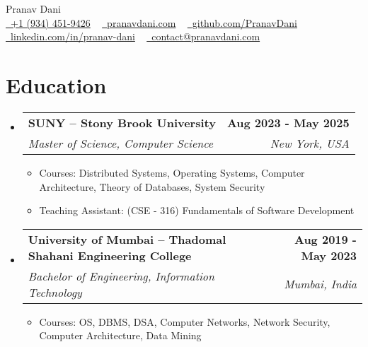\documentclass[letterpaper,11pt]{article}
\makeatletter
\newcommand{\resumeItem}[1]{
  \item\small{
    {#1 \vspace{-2pt}}
  }
}
\newcommand{\resumeSubheading}[4]{
  \vspace{-2pt}\item
    \begin{tabular*}{1.0\textwidth}[t]{l@{\extracolsep{\fill}}r}
      \vspace{-2pt}\textbf{#1} & \textbf{\small #2} \\
      \textit{\small#3} & \textit{\small #4} \\
    \end{tabular*}\vspace{-7pt}
}
\newcommand{\resumeSubHeadingListStart}{\begin{itemize}[leftmargin=0.0in, label={}]}
\newcommand{\resumeSubHeadingListEnd}{\end{itemize}}
\newcommand{\resumeItemListStart}{\begin{itemize}}
\newcommand{\resumeItemListEnd}{\end{itemize}\vspace{-5pt}}
\makeatother
\begin{document}

\begin{center}
    {\huge Pranav Dani} \\ \vspace{4pt}
    \small
    \faMobile
    \href{tel:+19344529426}{\raisebox{-0.2\height}\ +1 (934) 451-9426} ~
    \faGlobe \href{https://pranavdani.com}{\raisebox{-0.1\height}\ pranavdani.com} ~
    \faGithub \href{https://github.com/PranavDani}{\raisebox{-0.2\height}\ github.com/PranavDani} ~
    \\
    \faLinkedin \href{https://linkedin.com/in/pranav-dani}{\raisebox{-0.2\height}\ linkedin.com/in/pranav-dani} ~
    \faEnvelope \href{mailto:contact@pranavdani.com}{\raisebox{-0.2\height}\  contact@pranavdani.com}
    \vspace{-10pt}
\end{center}


\section{Education}
\resumeSubHeadingListStart
        \resumeSubheading
            {SUNY -- Stony Brook University}{Aug 2023 - May 2025}
            {Master of Science, Computer Science }{New York, USA}
            \resumeItemListStart
                \resumeItem{Courses: Distributed Systems, Operating Systems, Computer Architecture, Theory of Databases, System Security}
                \vspace{-2pt}
                \resumeItem{Teaching Assistant: (CSE - 316) Fundamentals of Software Development}
            \resumeItemListEnd
\vspace{-5pt}

        \resumeSubheading
            {University of Mumbai -- Thadomal Shahani Engineering College}{Aug 2019 - May 2023}
            {Bachelor of Engineering, Information Technology}{Mumbai, India}
            \resumeItemListStart
                \resumeItem{Courses: OS, DBMS, DSA, Computer Networks, Network Security, Computer Architecture, Data Mining}
            \resumeItemListEnd
    \resumeSubHeadingListEnd
\vspace{-20pt}
\end{document}
